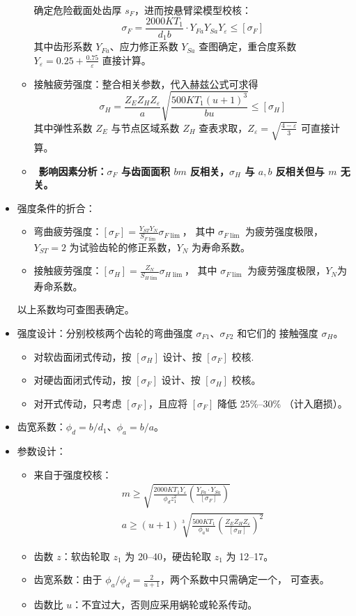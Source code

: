\documentclass[12pt,a4paper]{article}
\newcommand{\tightlist}{\setlength{\parskip}{0pt}\setlength{\itemsep}{0pt}}
\newcommand{\hint}[1]{\textsf{（#1）}}
\renewcommand{\emph}[1]{\faIcon[regular]{lightbulb}\ \textbf{#1}}
\begin{document}
\begin{itemize}
\begin{itemize}
        确定危险截面处齿厚 $s_F$，进而按悬臂梁模型校核：
        \[ \sigma_F=\frac{2000KT_1}{d_1b}\cdot Y_{Fa}Y_{Sa}Y_\varepsilon\leq
        [\sigma_F] \]
        其中齿形系数 $Y_{Fa}$、应力修正系数 $Y_{Sa}$ 查图确定，重合度系数
        $Y_\varepsilon=0.25+\frac{0.75}\varepsilon$ 直接计算。
        \item 接触疲劳强度：整合相关参数，代入赫兹公式可求得
        \[ \sigma_H=\frac{Z_EZ_HZ_\varepsilon}{a}\sqrt{\frac{500KT_1(u+1)^3}{bu}}
        \leq[\sigma_H] \]
        其中弹性系数 $Z_E$ 与节点区域系数 $Z_H$ 查表求取，$Z_\varepsilon=\sqrt{\frac{
        4-\varepsilon}3}$ 可直接计算。
        \item \emph{影响因素分析：$\sigma_F$ 与齿面面积 $bm$ 反相关，$\sigma_H$ 与
        $a,b$ 反相关但与 $m$ 无关。}
    \end{itemize}
    \item 强度条件的折合：
    \begin{itemize}\tightlist
        \item 弯曲疲劳强度：$[\sigma_F]=\frac{Y_{ST}Y_N}{S_{F\lim}}\sigma_{F\lim}$，
        其中 $\sigma_{F\lim}$ 为疲劳强度极限，$Y_{ST}=2$ 为试验齿轮的修正系数，$Y_N$
        为寿命系数。
        \item 接触疲劳强度：$[\sigma_H]=\frac{Z_N}{S_{H\lim}}\sigma_{H\lim}$，
        其中 $\sigma_{F\lim}$ 为疲劳强度极限，$Y_N$为寿命系数。
    \end{itemize}
    以上系数均可查图表确定。
    \item 强度设计：分别校核两个齿轮的弯曲强度 $\sigma_{F1}$、$\sigma_{F2}$ 和它们的
    接触强度 $\sigma_H$。
    \begin{itemize}
        \item 对软齿面闭式传动，按 $[\sigma_H]$ 设计、按 $[\sigma_F]$ 校核.
        \item 对硬齿面闭式传动，按 $[\sigma_F]$ 设计、按 $[\sigma_H]$ 校核。
        \item 对开式传动，只考虑 $[\sigma_F]$，且应将 $[\sigma_F]$ 降低 25\%--30\%
        \hint{计入磨损}。 
    \end{itemize}
    \item 齿宽系数：$\phi_d=b/d_1$、$\phi_a=b/a$。
    \item 参数设计：
    \begin{itemize}\tightlist
        \item 来自于强度校核：
        \begin{gather}
        m\geq\sqrt{\frac{2000KT_1Y_\varepsilon}{\phi_dz_1^2}\left(\frac{Y_{Fa}
        \cdot Y_{Sa}}{[\sigma_F]}\right)}\\
        a\geq(u+1)\sqrt[3]{\frac{500KT_1}{\phi_au}\left(\frac{Z_EZ_HZ_\varepsilon
        }{[\sigma_H]}\right)^2}
        \end{gather}
        \item 齿数 $z$：软齿轮取 $z_1$ 为 20--40，硬齿轮取 $z_1$ 为 12--17。
        \item 齿宽系数：由于 $\phi_a/\phi_d=\frac{2}{u+1}$，两个系数中只需确定一个，
        可查表。
        \item 齿数比 $u$：不宜过大，否则应采用蜗轮或轮系传动。
    \end{itemize}
\end{itemize}
\end{document}
